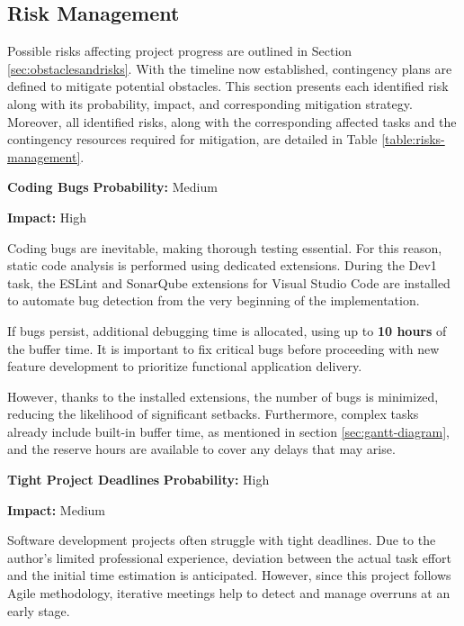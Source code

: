 
\newpage

\subsection{Risk Management}
\label{sec:risk-management}

Possible risks affecting project progress are outlined in Section \ref{sec:obstaclesandrisks}. With the timeline now established, contingency plans are defined to mitigate potential obstacles. This section presents each identified risk along with its probability, impact, and corresponding mitigation strategy. Moreover, all identified risks, along with the corresponding affected tasks and the contingency resources required for mitigation, are detailed in Table \ref{table:risks-management}.

\vspace{10pt}

\noindent\textbf{Coding Bugs} \hfill \textbf{Probability:} Medium 

\hfill \textbf{Impact:} High

Coding bugs are inevitable, making thorough testing essential. For this reason, static code analysis is performed using dedicated extensions. During the Dev1 task, the ESLint and SonarQube extensions for Visual Studio Code are installed to automate bug detection from the very beginning of the implementation.

If bugs persist, additional debugging time is allocated, using up to \textbf{10 hours} of the buffer time. It is important to fix critical bugs before proceeding with new feature development to prioritize functional application delivery.

However, thanks to the installed extensions, the number of bugs is minimized, reducing the likelihood of significant setbacks. Furthermore, complex tasks already include built-in buffer time, as mentioned in section \ref{sec:gantt-diagram}, and the reserve hours are available to cover any delays that may arise.

\vspace{10pt}

\noindent\textbf{Tight Project Deadlines} \hfill \textbf{Probability:} High
 
\hfill \textbf{Impact:} Medium

Software development projects often struggle with tight deadlines. Due to the author's limited professional experience, deviation between the actual task effort and the initial time estimation is anticipated. However, since this project follows Agile methodology, iterative meetings help to detect and manage overruns at an early stage. 

